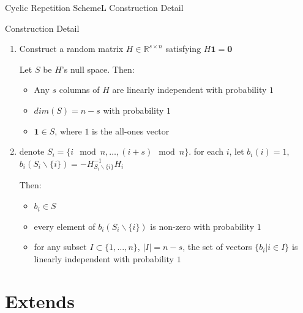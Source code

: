 \documentclass{beamer}
\begin{document}
\begin{frame}{Cyclic Repetition SchemeL Construction Detail}
    \begin{block}{Construction Detail}
        \begin{enumerate}
            \item Construct a random matrix $H \in \mathbb{R}^{s\times n}$ satisfying $H\boldsymbol{1} = \boldsymbol{0}$
            
            Let $S$ be $H$'s null space. Then:
            \begin{itemize}
                \item Any $s$ columns of $H$ are linearly independent with probability $1$
                \item $dim(S) = n - s$ with probability $1$
                \item $\boldsymbol{1}\in S$, where $1$ is the all-ones vector
            \end{itemize}
            \item denote $S_i = \{i \mod n, \dots, (i + s) \mod n\}.$ for each $i$, let $b_i(i) = 1$, $b_i(S_i \backslash \{i\}) = -H_{S_i \backslash \{i\}}^{-1}H_i$

            Then:
            \begin{itemize}
                \item $b_i\in S$
                \item every element of $b_i(S_i \backslash \{i\})$ is non-zero with probability $1$
                \item for any subset $I\subset\{1, \dots, n\}$, $\lvert I\rvert = n - s$, the set of vectors $\{b_i \vert i\in I\}$ is linearly independent with probability $1$
            \end{itemize}
        \end{enumerate}
    \end{block}
\end{frame}

\section{Extends}
\end{document}
